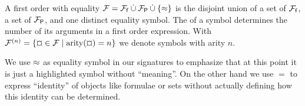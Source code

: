 
\begin{definition}\label{def:signature}
A
first order
 with equality
\( \mathcal{F} = {\mathcal{F}_{\mathsf{f}}} \mathbin{\dot\cup} {\mathcal{F}_{\mathsf{P}}} \mathbin{\dot\cup} \{\approx \} \)
is the disjoint union of
a set of  \( {\mathcal{F}_{\mathsf{f}}} \),
a set of  \( {\mathcal{F}_{\mathsf{P}}} \),
and one distinct equality symbol.
%
The  of a symbol determines the number of its arguments in a first order expression.
With \( \mcFn = \{ \Pf\in\mcF \mid \arity(\Pf) = n \} \) we denote symbols with arity \( n \).
\end{definition}

\begin{remark}
    We use \( \approx \) as equality symbol in our signatures to emphasize
    that at this point it is just a highlighted symbol
    without “meaning”.
    On the other hand we use \( = \) to express “identity” of objects
    like formulae or sets
    without actually defining how this identity can be determined.
\end{remark}
